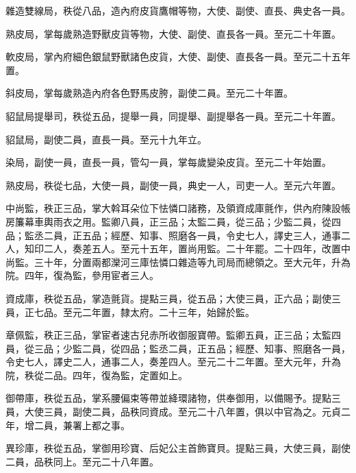 \begin{pinyinscope}
 雜造雙線局，秩從八品，造內府皮貨鷹帽等物，大使、副使、直長、典史各一員。



 熟皮局，掌每歲熟造野獸皮貨等物，大使、副使、直長各一員。至元二十年置。



 軟皮局，掌內府細色銀鼠野獸諸色皮貨，大使、副使、直長各一員。至元二十五年置。



 斜皮局，掌每歲熟造內府各色野馬皮胯，副使二員。至元二十年置。



 貂鼠局提舉司，秩從五品，提舉一員，同提舉、副提舉各一員。至元二十年置。



 貂鼠局，副使二員，直長一員。至元十九年立。



 染局，副使一員，直長一員，管勾一員，掌每歲變染皮貨。至元二十年始置。



 熟皮局，秩從七品，大使一員，副使一員，典史一人，司吏一人。至元六年置。



 中尚監，秩正三品，掌大斡耳朵位下怯憐口諸務，及領資成庫氈作，供內府陳設帳房簾幕車輿雨衣之用。監卿八員，正三品；太監二員，從三品；少監二員，從四品；監丞二員，正五品；經歷、知事、照磨各一員，令史七人，譯史三人，通事二人，知印二人，奏差五人。至元十五年，置尚用監。二十年罷。二十四年，改置中尚監。三十年，分置兩都灤河三庫怯憐口雜造等九司局而總領之。至大元年，升為院。四年，復為監，參用宦者三人。



 資成庫，秩從五品，掌造氈貨。提點三員，從五品；大使三員，正六品；副使三員，正七品。至元二年置，隸太府。二十三年，始歸於監。



 章佩監，秩正三品，掌宦者速古兒赤所收御服寶帶。監卿五員，正三品；太監四員，從三品；少監二員，從四品；監丞二員，正五品；經歷、知事、照磨各一員，令史七人，譯史二人，通事二人，奏差四人。至元二十二年置。至大元年，升為院，秩從二品。四年，復為監，定置如上。



 御帶庫，秩從五品，掌系腰偏束等帶並絳環諸物，供奉御用，以備賜予。提點三員，大使三員，副使二員，品秩同資成。至元二十八年置，俱以中官為之。元貞二年，增二員，兼署上都之事。



 異珍庫，秩從五品，掌御用珍寶、后妃公主首飾寶貝。提點三員，大使三員，副使二員，品秩同上。至元二十八年置。




\end{pinyinscope}
